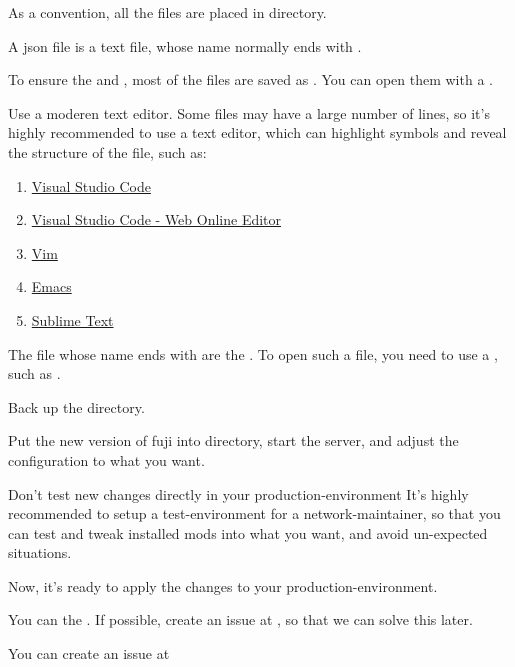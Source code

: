 \label{ch:q&a}


As a convention, all the files are placed in  directory.


A json file is a text file, whose name normally ends with .


To ensure the  and , most of the files are saved as .
You can open them with a .

\begin{tips}{Use a moderen text editor.}
    Some files may have a large number of lines, so it's highly recommended to use a  text editor, which can highlight symbols and reveal the structure of the file, such as:
    \begin{enumerate}
        \item \href{https://code.visualstudio.com/}{Visual Studio Code}
        \item \href{https://vscode.dev/}{Visual Studio Code - Web Online Editor}
        \item \href{https://www.vim.org/}{Vim}
        \item \href{https://www.gnu.org/software/emacs/}{Emacs}
        \item \href{https://www.sublimetext.com/}{Sublime Text}
    \end{enumerate}
\end{tips}


The file whose name ends with  are the .
To open such a file, you need to use a , such as .



Back up the  directory.

Put the new version of fuji into  directory, start the server, and adjust the configuration to what you want.

\begin{warn}{Don't test new changes directly in your production-environment}
    It's highly recommended to setup a test-environment for a network-maintainer, so that you can test and tweak installed mods into what you want, and avoid un-expected situations.
\end{warn}

Now, it's ready to apply the changes to your production-environment.


You can  the .
If possible, create an issue at \issueurl, so that we can solve this later.


You can create an issue at \issueurl



